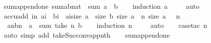 \begin{isabellebody}
\isadelimproof
\isanewline
%
\endisadelimproof
\isanewline
{}\isamarkupfalse%
\ sum{\isacharunderscore}append{\isacharunderscore}one{\isacharcolon}\ {\isachardoublequoteopen}sum{\isacharparenleft}a{\isacharat}{\isacharbrackleft}{\isacharparenleft}b{\isacharcolon}{\isacharcolon}nat{\isacharparenright}{\isacharbrackright}{\isacharparenright}\ {\isacharequal}\ sum\ a\ {\isacharplus}\ b{\isachardoublequoteclose}\isanewline
%
\isadelimproof
\ \ %
\endisadelimproof
%
\isatagproof
{}\isamarkupfalse%
\ {\isacharparenleft}induction\ a{\isacharparenright}\isanewline
\ \ \ \isamarkupfalse%
\ auto\isanewline
\ \ \isamarkupfalse%
%
\endisatagproof
{\isafoldproof}%
%
\isadelimproof
\isanewline
%
\endisadelimproof
\isanewline
{}\isamarkupfalse%
\ accu{\isacharunderscore}add{\isacharcolon}\ {\isachardoublequoteopen}{\isasymlbrakk}{\isasymforall}i{\isacharless}{\isacharparenleft}n{\isacharminus}{}{\isacharparenright}{\isachardot}\ a{\isacharbang}i\ {\isacharplus}\ b{\isacharbang}i\ {\isacharequal}\ a{\isacharbang}{\isacharparenleft}i{\isacharplus}{}{\isacharparenright}{\isacharsemicolon}size\ a\ {\isacharequal}\ size\ b{\isacharsemicolon}\ size\ a\ {\isasymge}\ n{\isacharsemicolon}\ size\ a\ {\isachargreater}\ {}{\isacharsemicolon}\ n\ {\isachargreater}\ {}{\isasymrbrakk}\ {\isasymLongrightarrow}\ \isanewline
\ \ a{\isacharbang}{\isacharparenleft}n{\isacharminus}{}{\isacharparenright}{\isacharplus}b{\isacharbang}{\isacharparenleft}n{\isacharminus}{}{\isacharparenright}\ {\isacharequal}\ a{\isacharbang}{\isacharparenleft}{}{\isacharparenright}\ {\isacharplus}\ {\isacharparenleft}sum\ {\isacharparenleft}take\ n\ b{\isacharparenright}{\isacharparenright}{\isachardoublequoteclose}\isanewline
%
\isadelimproof
\ \ %
\endisadelimproof
%
\isatagproof
{}\isamarkupfalse%
\ {\isacharparenleft}induction\ n{\isacharparenright}\isanewline
\ \ \ \isamarkupfalse%
\ auto\isanewline
\ \ \isamarkupfalse%
\ {\isacharparenleft}case{\isacharunderscore}tac\ {\isachardoublequoteopen}n{\isacharequal}{}{\isachardoublequoteclose}{\isacharparenright}\isanewline
\ \ \ \isamarkupfalse%
\ {\isacharparenleft}auto\ simp\ add{\isacharcolon}\ take{\isacharunderscore}Suc{\isacharunderscore}conv{\isacharunderscore}app{\isacharunderscore}nth{\isacharparenright}\isanewline
\ \ \isamarkupfalse%
\ sum{\isacharunderscore}append{\isacharunderscore}one\ \isamarkupfalse%

\end{isabellebody}
